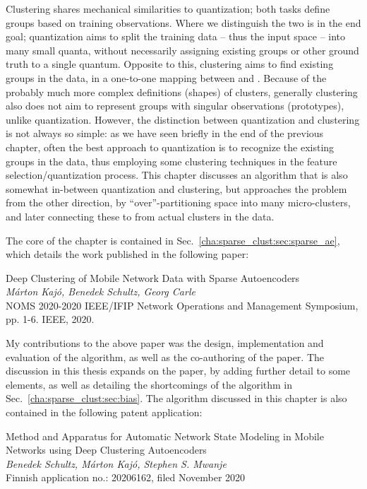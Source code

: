 	Clustering shares mechanical similarities to quantization; both tasks define groups based on training observations.
	Where we distinguish the two is in the end goal; quantization aims to split the training data -- thus the input space -- into many small quanta, without necessarily assigning existing groups or other ground truth to a single quantum.
	Opposite to this, clustering aims to find existing groups in the data, in a one-to-one mapping between  and .
	Because of the probably much more complex definitions (shapes) of clusters, generally clustering also does not aim to represent groups with singular observations (prototypes), unlike quantization.
	However, the distinction between quantization and clustering is not always so simple: as we have seen briefly in the end of the previous chapter, often the best approach to quantization is to recognize the existing groups in the data, thus employing some clustering techniques in the feature selection/quantization process.
	This chapter discusses an algorithm that is also somewhat in-between quantization and clustering, but approaches the problem from the other direction, by ``over''-partitioning space into many micro-clusters, and later connecting these to from actual clusters in the data.
	
	The core of the chapter is contained in Sec.~\ref{cha:sparse_clust:sec:sparse_ae}, which details the work published in the following paper:
	
	\begin{publication}
		Deep Clustering of Mobile Network Data with Sparse Autoencoders \\
		\textit{Márton Kajó, Benedek Schultz, Georg Carle} \\
		NOMS 2020-2020 IEEE/IFIP Network Operations and Management Symposium, pp. 1-6. IEEE, 2020.
	\end{publication}

	My contributions to the above paper was the design, implementation and evaluation of the algorithm, as well as the co-authoring of the paper.
	The discussion in this thesis expands on the paper, by adding further detail to some elements, as well as detailing the shortcomings of the algorithm in Sec.~\ref{cha:sparse_clust:sec:bias}.
	The algorithm discussed in this chapter is also contained in the following patent application:
	
	\begin{patent}
		Method and Apparatus for Automatic Network State Modeling in Mobile Networks using Deep Clustering Autoencoders \\
		\textit{Benedek Schultz, Márton Kajó, Stephen S. Mwanje} \\
		Finnish application no.: 20206162, filed November 2020
	\end{patent}

